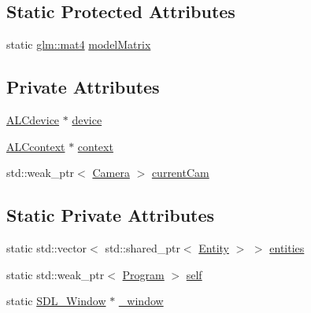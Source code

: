 \subsection*{Static Protected Attributes}
\begin{DoxyCompactItemize}
\item 
static \mbox{\hyperlink{group__core__types_ga7dcd2365c2e368e6af5b7adeb6a9c8df}{glm\+::mat4}} \mbox{\hyperlink{class_aspect_1_1_engine_1_1_program_a713b2d1d51158b44ffcc97f7f69933a4}{model\+Matrix}}
\end{DoxyCompactItemize}
\subsection*{Private Attributes}
\begin{DoxyCompactItemize}
\item 
\mbox{\hyperlink{alc_8h_aba8742179fd52ef41c66adacdec5383e}{A\+L\+Cdevice}} $\ast$ \mbox{\hyperlink{class_aspect_1_1_engine_1_1_program_aa4689537736d1273e4e644947a61c465}{device}}
\item 
\mbox{\hyperlink{alc_8h_ad085cf94ff96646b5a2b5401c4489e23}{A\+L\+Ccontext}} $\ast$ \mbox{\hyperlink{class_aspect_1_1_engine_1_1_program_ac5c7dbe0c0a08b0603625567e08e5c46}{context}}
\item 
std\+::weak\+\_\+ptr$<$ \mbox{\hyperlink{class_aspect_1_1_engine_1_1_camera}{Camera}} $>$ \mbox{\hyperlink{class_aspect_1_1_engine_1_1_program_ab013b5b5fc5de055ccbb70d44b49de8a}{current\+Cam}}
\end{DoxyCompactItemize}
\subsection*{Static Private Attributes}
\begin{DoxyCompactItemize}
\item 
static std\+::vector$<$ std\+::shared\+\_\+ptr$<$ \mbox{\hyperlink{class_aspect_1_1_engine_1_1_entity}{Entity}} $>$ $>$ \mbox{\hyperlink{class_aspect_1_1_engine_1_1_program_a553a6feb2e63f3901ddfad5ebba9fa99}{entities}}
\item 
static std\+::weak\+\_\+ptr$<$ \mbox{\hyperlink{class_aspect_1_1_engine_1_1_program}{Program}} $>$ \mbox{\hyperlink{class_aspect_1_1_engine_1_1_program_a956d0f100139d714030fa5449c2c2849}{self}}
\item 
static \mbox{\hyperlink{_s_d_l__video_8h_a55a196c7d3b8497538632c79ae1e6392}{S\+D\+L\+\_\+\+Window}} $\ast$ \mbox{\hyperlink{class_aspect_1_1_engine_1_1_program_a674502c50c3ab53a86dd2d7966b2506d}{\+\_\+window}}
\end{DoxyCompactItemize}


